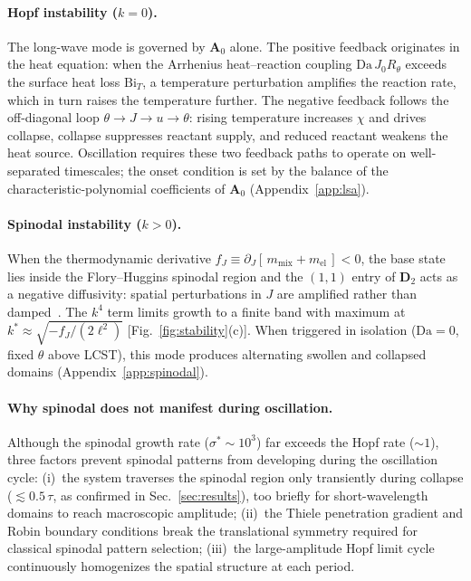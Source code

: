\documentclass[aps,pre,reprint,superscriptaddress,longbibliography,floatfix]{revtex4-2}
\newcommand{\Da}{\mathrm{Da}}
\newcommand{\Bi}{\mathrm{Bi}}
\begin{document}
\paragraph{Hopf instability ($k=0$).}
The long-wave mode is governed by $\mathbf A_0$ alone.  The positive
feedback originates in the heat equation: when the Arrhenius
heat--reaction coupling $\Da\,J_0 R_\theta$ exceeds the surface heat
loss $\Bi_T$, a temperature perturbation amplifies the reaction rate,
which in turn raises the temperature further.
The negative feedback follows the off-diagonal loop
$\theta\to J\to u\to\theta$: rising temperature increases $\chi$ and
drives collapse, collapse suppresses reactant supply, and reduced
reactant weakens the heat source.  Oscillation requires these two
feedback paths to operate on well-separated timescales; the onset
condition is set by the balance of the characteristic-polynomial
coefficients of $\mathbf A_0$
(Appendix~\ref{app:lsa}).

\paragraph{Spinodal instability ($k>0$).}
When the thermodynamic derivative $f_J\equiv\partial_J[\,m_\mathrm{mix}
+m_\mathrm{el}\,]<0$, the base state lies inside the Flory--Huggins
spinodal region and the $(1,1)$ entry of $\mathbf D_2$ acts as a
negative diffusivity: spatial perturbations in $J$ are amplified
rather than damped~\cite{Onuki1993,Bai2023}.  The $k^4$ term limits
growth to a finite band with maximum at
$k^\ast\approx\sqrt{-f_J/(2\ell^2)}$
[Fig.~\ref{fig:stability}(c)].  When triggered in isolation
($\Da=0$, fixed $\theta$ above LCST), this mode produces alternating
swollen and collapsed domains (Appendix~\ref{app:spinodal}).

\paragraph{Why spinodal does not manifest during oscillation.}
Although the spinodal growth rate ($\sigma^\ast\sim 10^3$) far exceeds
the Hopf rate ($\sim\!1$), three factors prevent spinodal patterns
from developing during the oscillation cycle: (i)~the system traverses
the spinodal region only transiently during collapse
($\lesssim 0.5\,\tau$, as confirmed in Sec.~\ref{sec:results}), too briefly for short-wavelength domains to
reach macroscopic amplitude; (ii)~the Thiele penetration gradient and
Robin boundary conditions break the translational symmetry required
for classical spinodal pattern selection; (iii)~the large-amplitude
Hopf limit cycle continuously homogenizes the spatial structure at
each period.
\end{document}
